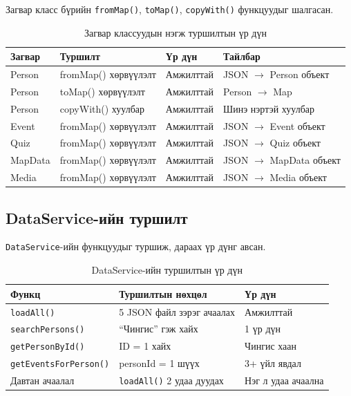Загвар класс бүрийн \texttt{fromMap()}, \texttt{toMap()}, \texttt{copyWith()} функцуудыг шалгасан.

\begin{table}[htbp]
\centering
\begin{tabular}{|p{3cm}|p{5cm}|p{2cm}|p{3.5cm}|}
\hline
\textbf{Загвар} & \textbf{Туршилт} & \textbf{Үр дүн} & \textbf{Тайлбар} \\
\hline
Person & fromMap() хөрвүүлэлт & Амжилттай & JSON $\rightarrow$ Person объект \\
\hline
Person & toMap() хөрвүүлэлт & Амжилттай & Person $\rightarrow$ Map\\
\hline
Person & copyWith() хуулбар & Амжилттай & Шинэ нэртэй хуулбар \\
\hline
Event & fromMap() хөрвүүлэлт & Амжилттай & JSON $\rightarrow$ Event объект \\
\hline
Quiz & fromMap() хөрвүүлэлт & Амжилттай & JSON $\rightarrow$ Quiz объект \\
\hline
MapData & fromMap() хөрвүүлэлт & Амжилттай & JSON $\rightarrow$ MapData объект \\
\hline
Media & fromMap() хөрвүүлэлт & Амжилттай & JSON $\rightarrow$ Media объект \\
\hline
\end{tabular}
\caption{Загвар классуудын нэгж туршилтын үр дүн}
\label{tab:model_tests}
\end{table}

\subsection{DataService-ийн туршилт}

\texttt{DataService}-ийн функцуудыг туршиж, дараах үр дүнг авсан.

\begin{table}[htbp]
\centering
\begin{tabular}{|p{4.5cm}|p{5cm}|p{2cm}|}
\hline
\textbf{Функц} & \textbf{Туршилтын нөхцөл} & \textbf{Үр дүн} \\
\hline
\texttt{loadAll()} & 5 JSON файл зэрэг ачаалах & Амжилттай \\
\hline
\texttt{searchPersons()} & ``Чингис'' гэж хайх & 1 үр дүн \\
\hline
\texttt{getPersonById()} & ID = 1 хайх & Чингис хаан \\
\hline
\texttt{getEventsForPerson()} & personId = 1 шүүх & 3+ үйл явдал \\
\hline
Давтан ачаалал & \texttt{loadAll()} 2 удаа дуудах & Нэг л удаа ачаална \\
\hline
\end{tabular}
\caption{DataService-ийн туршилтын үр дүн}
\label{tab:dataservice_tests}
\end{table}

